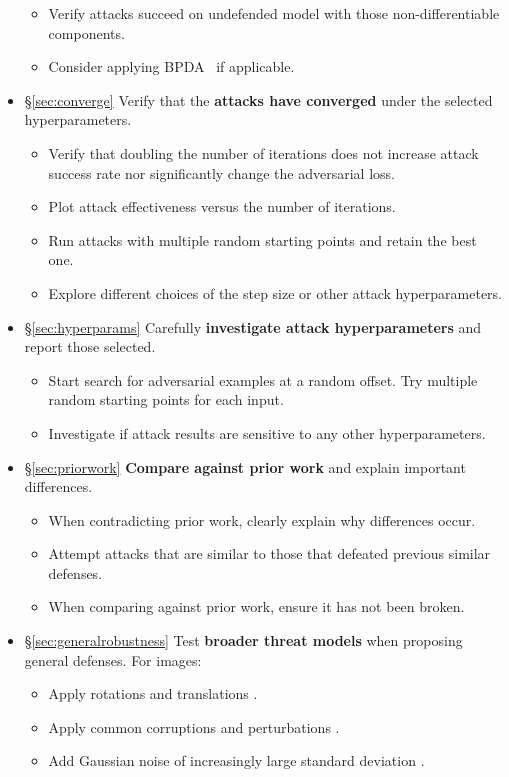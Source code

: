 \documentclass{article} %
\begin{document}
\begin{itemize}[leftmargin=*]
\begin{itemize}[leftmargin=*]
  \item Verify attacks succeed on undefended model with those non-differentiable components.
  \item Consider applying BPDA~\citep{athalye2018obfuscated} if applicable.
  \end{itemize}
\item \S\ref{sec:converge} Verify that the \textbf{attacks have converged} under the selected hyperparameters.
  \begin{itemize}[leftmargin=*]
  \item Verify that doubling the number of iterations does not increase attack success rate nor significantly change the adversarial loss.
  \item Plot attack effectiveness versus the number of iterations.
  \item Run attacks with multiple random starting points and retain the best one.
  \item Explore different choices of the step size or other attack hyperparameters.
  \end{itemize}
\item \S\ref{sec:hyperparams} Carefully \textbf{investigate attack hyperparameters} and report those selected.
  \begin{itemize}[leftmargin=*]
  \item Start search for adversarial examples at a random offset. Try multiple random starting points for each input.
  \item Investigate if attack results are sensitive to any other hyperparameters.
  \end{itemize}
  \item \S\ref{sec:priorwork} \textbf{Compare against prior work} and explain important differences.
  \begin{itemize}[leftmargin=*]
  \item When contradicting prior work, clearly explain why differences occur.
  \item Attempt attacks that are similar to those that defeated previous similar defenses.
  \item When comparing against prior work, ensure it has not been broken.
  \end{itemize}
\item \S\ref{sec:generalrobustness} Test \textbf{broader threat models} when proposing general defenses. For images:
  \begin{itemize}[leftmargin=*]
  \item Apply rotations and translations \citep{engstrom2017rotation}.
  \item Apply common corruptions and perturbations \citep{hendrycks2018benchmarking}.
  \item Add Gaussian noise of increasingly large standard deviation \citep{ford2019adversarial}.
  \end{itemize}
  

\end{itemize}
\end{document}
